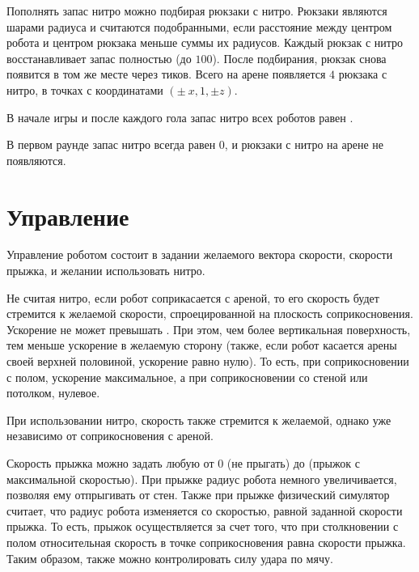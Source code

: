 Пополнять запас нитро можно подбирая рюкзаки с нитро.
Рюкзаки являются шарами радиуса  и считаются подобранными,
если расстояние между центром робота и центром рюкзака меньше суммы их радиусов.
Каждый рюкзак с нитро восстанавливает запас полностью (до $100$).
После подбирания, рюкзак снова появится в том же месте через  тиков.
Всего на арене появляется $4$ рюкзака с нитро, в точках с координатами $(\pm\ x, 1, \pm z)$.

В начале игры и после каждого гола запас нитро всех роботов равен .

В первом раунде запас нитро всегда равен $0$, и рюкзаки с нитро на арене не появляются.

\section{Управление}

Управление роботом состоит в задании желаемого вектора скорости, скорости прыжка, и желании использовать нитро.

Не считая нитро, если робот соприкасается с ареной, то
его скорость будет стремится к желаемой скорости, спроецированной на плоскость соприкосновения.
Ускорение не может превышать .
При этом, чем более вертикальная поверхность, тем меньше ускорение в желаемую сторону
(также, если робот касается арены своей верхней половиной, ускорение равно нулю).
То есть, при соприкосновении с полом, ускорение максимальное, а при соприкосновении со стеной или потолком, нулевое.

При использовании нитро, скорость также стремится к желаемой, однако уже независимо от соприкосновения с ареной.

Скорость прыжка можно задать любую от $0$ (не прыгать) до  (прыжок с максимальной скоростью).
При прыжке радиус робота немного увеличивается, позволяя ему отпрыгивать от стен.
Также при прыжке физический симулятор считает, что радиус робота изменяется со скоростью, равной заданной скорости прыжка.
То есть, прыжок осуществляется за счет того, что при столкновении с полом
относительная скорость в точке соприкосновения равна скорости прыжка.
Таким образом, также можно контролировать силу удара по мячу.